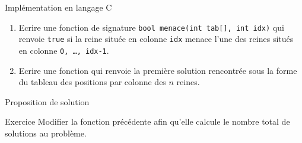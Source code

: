 \documentclass[10pt]{beamer}
\begin{document}
\begin{frame}[fragile]{\Ctitle}{\stitle}
    \begin{exampleblock}{Implémentation en langage C}
        \begin{enumerate}
            \item Ecrire une fonction de signature \texttt{bool menace(int tab[], int idx)} qui renvoie \texttt{true} si la reine située en colonne {\tt idx} menace l'une des reines situés en colonne {\tt 0, \dots, idx-1}.\\
            \item<3-> Ecrire une fonction qui renvoie la première solution rencontrée sous la forme du tableau des positions par colonne des $n$ reines.
        \end{enumerate}
    \end{exampleblock}
\end{frame}


\begin{frame}[fragile]{\Ctitle}{\stitle}
    \begin{exampleblock}{Proposition de solution}
    \end{exampleblock}
\end{frame}

\begin{frame}[fragile]{\Ctitle}{\stitle}
    \begin{exampleblock}{Exercice}
            Modifier la fonction précédente afin qu'elle calcule le nombre total de solutions au problème.
    \end{exampleblock}
\end{frame}
\end{document}
